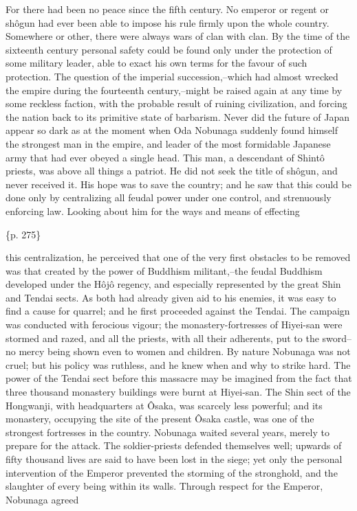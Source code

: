 For there had been no peace since the fifth century. No emperor or regent or shôgun had ever been able to impose his rule firmly upon the whole country. Somewhere or other, there were always wars of clan with clan. By the time of the sixteenth century personal safety could be found only under the protection of some military leader, able to exact his own terms for the favour of such protection. The question of the imperial succession,--which had almost wrecked the empire during the fourteenth century,--might be raised again at any time by some reckless faction, with the probable result of ruining civilization, and forcing the nation back to its primitive state of barbarism. Never did the future of Japan appear so dark as at the moment when Oda Nobunaga suddenly found himself the strongest man in the empire, and leader of the most formidable Japanese army that had ever obeyed a single head. This man, a descendant of Shintô priests, was above all things a patriot. He did not seek the title of shôgun, and never received it. His hope was to save the country; and he saw that this could be done only by centralizing all feudal power under one control, and strenuously enforcing law. Looking about him for the ways and means of effecting

\{p. 275\}

this centralization, he perceived that one of the very first obstacles to be removed was that created by the power of Buddhism militant,--the feudal Buddhism developed under the Hôjô regency, and especially represented by the great Shin and Tendai sects. As both had already given aid to his enemies, it was easy to find a cause for quarrel; and he first proceeded against the Tendai. The campaign was conducted with ferocious vigour; the monastery-fortresses of Hiyei-san were stormed and razed, and all the priests, with all their adherents, put to the sword--no mercy being shown even to women and children. By nature Nobunaga was not cruel; but his policy was ruthless, and he knew when and why to strike hard. The power of the Tendai sect before this massacre may be imagined from the fact that three thousand monastery buildings were burnt at Hiyei-san. The Shin sect of the Hongwanji, with headquarters at Ôsaka, was scarcely less powerful; and its monastery, occupying the site of the present Ôsaka castle, was one of the strongest fortresses in the country. Nobunaga waited several years, merely to prepare for the attack. The soldier-priests defended themselves well; upwards of fifty thousand lives are said to have been lost in the siege; yet only the personal intervention of the Emperor prevented the storming of the stronghold, and the slaughter of every being within its walls. Through respect for the Emperor, Nobunaga agreed

